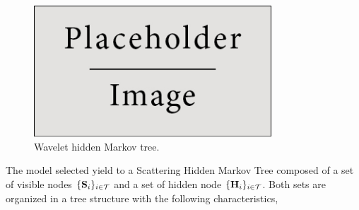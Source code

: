 \documentclass[a4paper,11pt]{report}
\begin{document}
		\begin{figure}
				\begin{center}
					\includegraphics[width=3.5in]{placeholder.jpg}
					\caption{Wavelet hidden Markov tree.} %
					\label{fig:WHMT}
				\end{center}
		\end{figure}
	  
	  The model selected yield to a Scattering Hidden Markov Tree composed of a set of visible nodes $\{{\bf S}_{i}\}_{i \in \mathcal{T}}$ and a set of hidden node $\{{\bf H}_{i}\}_{i \in \mathcal{T}}$. Both sets are organized in a tree structure with the following characteristics,\\
	  
\end{document}
